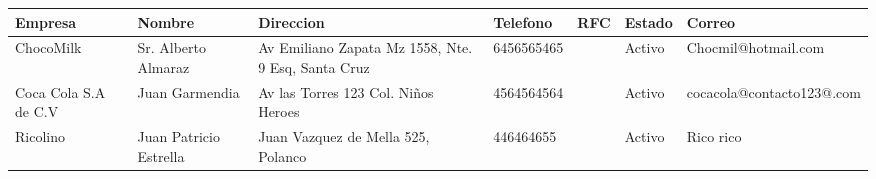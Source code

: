 \documentclass[a4paper,11pt]{article}
\begin{document}
\footnotesize  
\setlength\LTleft{-30pt}
 \setlength\LTright{-100pt}
  \begin{landscape}
 \thispagestyle{empty}
\begin{longtable}{|p{2.5cm}|p{2.5cm}|p{2.5cm}|p{2cm}|p{5cm}|p{1cm}|p{5cm}|}
\hline
\textbf{Empresa} & \textbf{Nombre} & \textbf{Direccion} & \textbf{Telefono} & \textbf{RFC} & \textbf{Estado} & \textbf{Correo}\\ \hline \hline ChocoMilk & Sr. Alberto Almaraz & Av Emiliano Zapata Mz 1558, Nte. 9 Esq, Santa Cruz & 6456565465 &  & Activo & Chocmil@hotmail.com \\ \hline 
Coca Cola S.A de C.V & Juan Garmendia & Av las Torres 123 Col. Niños Heroes & 4564564564 &  & Activo & cocacola@contacto123@.com \\ \hline 
Ricolino & Juan Patricio Estrella & Juan Vazquez de Mella 525, Polanco & 446464655 &  & Activo & Rico rico \\ \hline 
\end{longtable}
\thispagestyle{empty}
\end{landscape}
\end{document}
